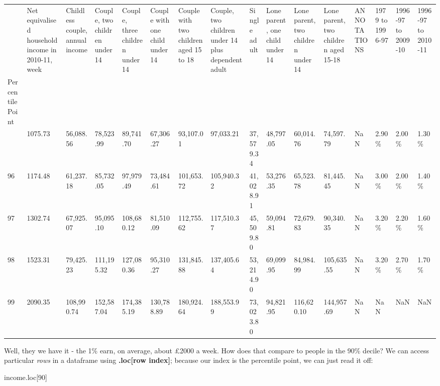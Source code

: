 \documentclass[
  letterpaper,
  DIV=11,
  numbers=noendperiod]{scrreprt}
\newenvironment{Shaded}{\begin{snugshade}}{\end{snugshade}}
\newcommand{\DecValTok}[1]{\textcolor[rgb]{0.68,0.00,0.00}{#1}}
\newcommand{\NormalTok}[1]{\textcolor[rgb]{0.00,0.23,0.31}{#1}}
\begin{document}
\begin{longtable}[]{@{}llllllllllllllll@{}}
\toprule\noalign{}
& Net equivalised household income in 2010-11, week & Childless couple,
annual income & Couple, two children under 14 & Couple, three children
under 14 & Couple with one child under 14 & Couple with two children
aged 15 to 18 & Couple, two children under 14 plus dependent adult &
Single adult & Lone parent, one child under 14 & Lone parent, two
children under 14 & Lone parent, two children aged 15-18 & ANNOTATIONS &
1979 to 1996-97 & 1996-97 to 2009-10 & 1996-97 to 2010-11 \\
Percentile Point & & & & & & & & & & & & & & & \\
\midrule\noalign{}
\endhead
\bottomrule\noalign{}
\endlastfoot
95 & 1075.73 & 56,088.56 & 78,523.99 & 89,741.70 & 67,306.27 & 93,107.01
& 97,033.21 & 37,579.34 & 48,797.05 & 60,014.76 & 74,597.79 & NaN &
2.90\% & 2.00\% & 1.30\% \\
96 & 1174.48 & 61,237.18 & 85,732.05 & 97,979.49 & 73,484.61 &
101,653.72 & 105,940.32 & 41,028.91 & 53,276.35 & 65,523.78 & 81,445.45
& NaN & 3.00\% & 2.00\% & 1.40\% \\
97 & 1302.74 & 67,925.07 & 95,095.10 & 108,680.12 & 81,510.09 &
112,755.62 & 117,510.37 & 45,509.80 & 59,094.81 & 72,679.83 & 90,340.35
& NaN & 3.20\% & 2.20\% & 1.60\% \\
98 & 1523.31 & 79,425.23 & 111,195.32 & 127,080.36 & 95,310.27 &
131,845.88 & 137,405.64 & 53,214.90 & 69,099.95 & 84,984.99 & 105,635.55
& NaN & 3.20\% & 2.70\% & 1.70\% \\
99 & 2090.35 & 108,990.74 & 152,587.04 & 174,385.19 & 130,788.89 &
180,924.64 & 188,553.99 & 73,023.80 & 94,821.95 & 116,620.10 &
144,957.69 & NaN & NaN & NaN & NaN \\
\end{longtable}

Well, they we have it - the 1\% earn, on average, about £2000 a week.
How does that compare to people in the 90\% decile? We can access
particular \emph{rows} in a dataframe using \textbf{.loc{[}row
index{]}}; because our index is the percentile point, we can just read
it off:

\begin{Shaded}
\begin{Highlighting}[]
\NormalTok{income.loc[}\DecValTok{90}\NormalTok{]}
\end{Highlighting}
\end{Shaded}
\end{document}
